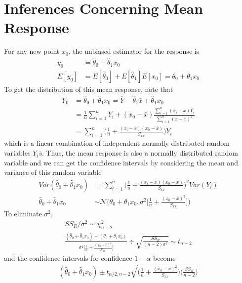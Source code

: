 \documentclass[../probability-notes.tex]{subfiles}
\begin{document}
    \section{Inferences Concerning Mean Response}\label{sec:infer_mean_resp}
    For any new point $x_{0}$, the unbiased estimator for the response is
    \begin{align*}
        y_{0} &= \hat{\theta}_{0} + \hat{\theta}_{1}x_{0}\\
        E[y_{0}] &= E[\hat{\theta}_{0}] + E[\hat{\theta}_{1}]E[x_{0}] = \theta_{0} + \theta_{1}x_{0}
    \end{align*}
    To get the distribution of this mean response, note that
    \begin{align*}
        Y_{0} &= \hat{\theta}_{0} + \hat{\theta}_{1}x_{0} = \overline{Y} - \hat{\theta}_{1}\bar{x} + \hat{\theta}_{1}x_{0}\\
        &= \frac{1}{n}\sum_{i=1}^{n} Y_{i} + (x_{0} - \bar{x})\frac{\sum_{i=1}^{n} (x_{i} - \bar{x})Y_{i}}{\sum_{i=1}^{n} (x-\bar{x})^{2}}\\
        &= \sum_{i=1}^{n} \bigg( \frac{1}{n} + \frac{(x_{i} - \bar{x})(x_{0} - \bar{x})}{S_{xx}} \bigg)Y_{i}
    \end{align*}
    which is a linear combination of independent normally distributed random variables $Y_{i}s$. Thus, the mean response is also a normally distributed random variable and we can get the confidence intervals by considering the mean and variance of this random variable
    \begin{align*}
        Var(\hat{\theta}_{0} + \hat{\theta}_{1}x_{0}) &= \sum_{i=1}^{n} \bigg( \frac{1}{n} + \frac{(x_{i} - \bar{x})(x_{0} - \bar{x})}{S_{xx}} \bigg)^{2}Var(Y_{i})\\
        \hat{\theta}_{0} + \hat{\theta}_{1}x_{0} &\sim \mathcal{N}\bigg(\theta_{0} + \theta_{1}x_{0}, \sigma^{2} \bigg[ \frac{1}{n} + \frac{(x_{0} - \bar{x})^{2}}{S_{xx}} \bigg]\bigg)
    \end{align*}
    To eliminate $\sigma^{2}$,
    \begin{gather*}
        SS_{R}/\sigma^{2} \sim \chi_{n-2}^{2}\\
        \frac{(\hat{\theta}_{0} + \hat{\theta}_{1}x_{0}) - (\theta_{0} + \theta_{1}x_{0})}{\sigma^{2} \bigg[ \frac{1}{n} + \frac{(x_{0} - \bar{x})^{2}}{S_{xx}} \bigg]} \div \sqrt{\frac{SS_{R}}{(n-2)\sigma^{2}}} \sim t_{n-2}
    \end{gather*}
    and the confidence intervals for confidence $1-\alpha$ become
    \begin{align*}
        (\hat{\theta}_{0} + \hat{\theta}_{1}x_{0}) \pm t_{\alpha/2, n-2} \sqrt{\bigg( \frac{1}{n} + \frac{(x_{0} - \bar{x})^{2}}{S_{xx}} \bigg) \bigg( \frac{SS_{R}}{n-2}\bigg)}
    \end{align*}
\end{document}

